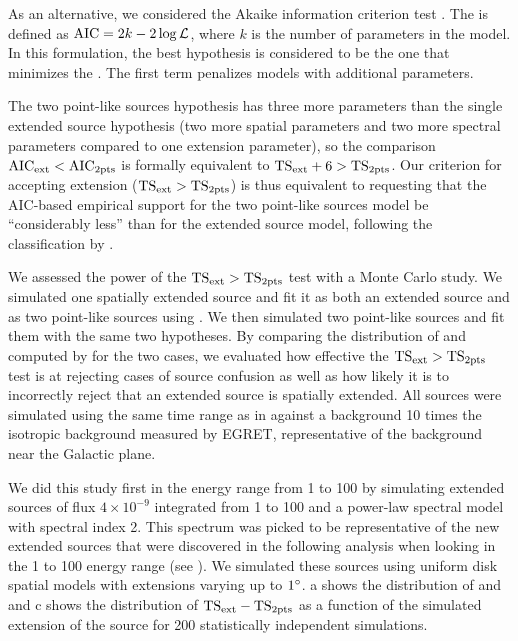 As an alternative, we considered the Akaike information criterion test \citep[\aic,][]{akaike_1974a_statistical-model}.
The \aic is defined as $\text{AIC}=2k-2\log\mathcal{L}$, where $k$ is the number of parameters in the model. 
In this formulation, the best hypothesis is considered to be the one that minimizes the \aic.
The first term penalizes models with additional parameters. 

The two point-like sources hypothesis has three more parameters than
the single extended source hypothesis (two more spatial parameters and
two more spectral parameters compared to one extension parameter), so the
comparison $\text{AIC}_\text{ext} < \text{AIC}_\text{2pts}$  is formally equivalent to
$\mathrm{TS}_\mathrm{ext} + 6 > \mathrm{TS}_{\mathrm{2pts}}$.  Our criterion for accepting extension ($\mathrm{TS}_\mathrm{ext} > \mathrm{TS}_{\mathrm{2pts}}$) 
is thus equivalent to requesting that the AIC-based empirical
support for the two point-like sources model be ``considerably less''
than for the extended source model, following the classification by
\cite{burnham_2002a_model-selection}.

We assessed the power of the $\mathrm{TS}_\mathrm{ext}>\mathrm{TS}_{\mathrm{2pts}}$ test with a Monte Carlo
study.  We simulated one spatially extended source and fit it as both
an extended source and as two point-like sources using \pointlike.
We then simulated two point-like sources and fit them with the same two
hypotheses. By comparing the distribution of \tsinc and \tsext computed by
\pointlike for the two cases, we evaluated how effective the $\mathrm{TS}_\mathrm{ext}>\mathrm{TS}_{\mathrm{2pts}}$
test is at rejecting cases of source confusion as well as how
likely it is to incorrectly reject that an extended source is spatially
extended.  All sources were simulated using the same time range as in
 against a background 10 times the
isotropic background measured by EGRET, representative of the background
near the Galactic plane.

We did this study first in the energy range from 1 \gev to 100 \gev by
simulating extended sources of flux $4\times10^{-9}$ \fluxunits integrated
from 1 \gev to 100 \gev and a power-law spectral model with
spectral index 2.  This spectrum was picked to be representative of the
new extended sources that were discovered in the following analysis
when looking in the 1 \gev to 100 \gev energy range
(see ).
We simulated these sources using uniform disk spatial models
with extensions varying
up to $1^\circ$.  
a shows the distribution
of \tsext and \tsinc and 
c shows 
the distribution of $\mathrm{TS}_\mathrm{ext}-\mathrm{TS}_{\mathrm{2pts}}$ as a
function of the simulated extension of the source
for 200 statistically independent simulations.

